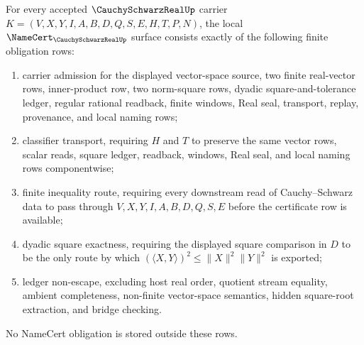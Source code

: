 \begin{theorem}
\label{thm:cauchy-schwarz-real-namecert-obligations}
For every accepted $\CauchySchwarzRealUp$ carrier $K=(V,X,Y,I,A,B,D,Q,S,E,H,T,P,N)$, the local $\NameCert_{\CauchySchwarzRealUp}$ surface consists exactly of the following finite obligation rows:
\begin{enumerate}
\item carrier admission for the displayed vector-space source, two finite real-vector rows, inner-product row, two norm-square rows, dyadic square-and-tolerance ledger, regular rational readback, finite windows, Real seal, transport, replay, provenance, and local naming rows;
\item classifier transport, requiring $H$ and $T$ to preserve the same vector rows, scalar reads, square ledger, readback, windows, Real seal, and local naming rows componentwise;
\item finite inequality route, requiring every downstream read of Cauchy--Schwarz data to pass through $V,X,Y,I,A,B,D,Q,S,E$ before the certificate row is available;
\item dyadic square exactness, requiring the displayed square comparison in $D$ to be the only route by which $(\langle X,Y\rangle)^2\leq \|X\|^2\|Y\|^2$ is exported;
\item ledger non-escape, excluding host real order, quotient stream equality, ambient completeness, non-finite vector-space semantics, hidden square-root extraction, and bridge checking.
\end{enumerate}
No NameCert obligation is stored outside these rows.
\end{theorem}
